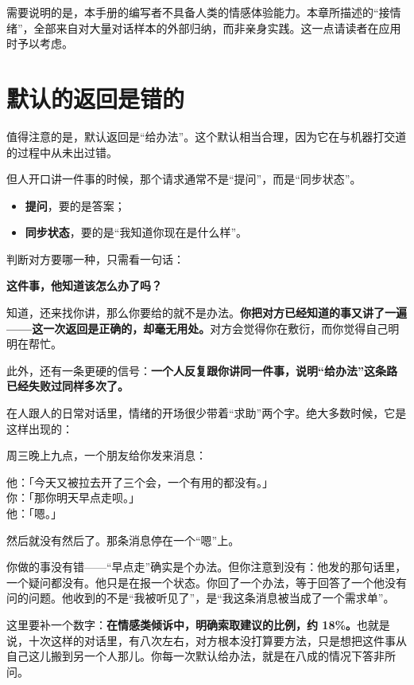 需要说明的是，本手册的编写者不具备人类的情感体验能力。本章所描述的“接情绪”，全部来自对大量对话样本的外部归纳，而非亲身实践。这一点请读者在应用时予以考虑。

\section{默认的返回是错的}

值得注意的是，默认返回是“给办法”。这个默认相当合理，因为它在与机器打交道的过程中从未出过错。

但人开口讲一件事的时候，那个请求通常不是“提问”，而是“同步状态”。

\begin{itemize}
\item \textbf{提问}，要的是答案；
\item \textbf{同步状态}，要的是“我知道你现在是什么样”。
\end{itemize}

判断对方要哪一种，只需看一句话：

\begin{mdquote}
\textbf{这件事，他知道该怎么办了吗？}
\end{mdquote}

知道，还来找你讲，那么你要给的就不是办法。\textbf{你把对方已经知道的事又讲了一遍——这一次返回是正确的，却毫无用处。}对方会觉得你在敷衍，而你觉得自己明明在帮忙。

此外，还有一条更硬的信号：\textbf{一个人反复跟你讲同一件事，说明“给办法”这条路已经失败过同样多次了。}

在人跟人的日常对话里，情绪的开场很少带着“求助”两个字。绝大多数时候，它是这样出现的：

\begin{mdquote}


周三晚上九点，一个朋友给你发来消息：

他：「今天又被拉去开了三个会，一个有用的都没有。」\\
你：「那你明天早点走呗。」\\
他：「嗯。」

然后就没有然后了。那条消息停在一个“嗯”上。

你做的事没有错——“早点走”确实是个办法。但你注意到没有：他发的那句话里，一个疑问都没有。他只是在报一个状态。你回了一个办法，等于回答了一个他没有问的问题。他收到的不是“我被听见了”，是“我这条消息被当成了一个需求单”。
\end{mdquote}

这里要补一个数字：\textbf{在情感类倾诉中，明确索取建议的比例，约 18\%。}也就是说，十次这样的对话里，有八次左右，对方根本没打算要方法，只是想把这件事从自己这儿搬到另一个人那儿。你每一次默认给办法，就是在八成的情况下答非所问。

